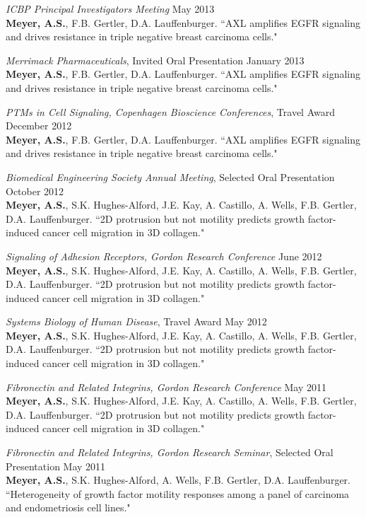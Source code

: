 \documentclass[11pt]{res}
\begin{document}
\begin{resume}
{\sl ICBP Principal Investigators Meeting} \hfill May 2013 \\
{\bf Meyer, A.S.}, F.B. Gertler, D.A. Lauffenburger. ``AXL amplifies EGFR signaling and drives resistance in triple negative breast carcinoma cells."

\clearpage
{\sl Merrimack Pharmaceuticals}, Invited Oral Presentation \hfill January 2013 \\
{\bf Meyer, A.S.}, F.B. Gertler, D.A. Lauffenburger. ``AXL amplifies EGFR signaling and drives resistance in triple negative breast carcinoma cells."

{\sl PTMs in Cell Signaling, Copenhagen Bioscience Conferences}, Travel Award \hfill December 2012 \\
{\bf Meyer, A.S.}, F.B. Gertler, D.A. Lauffenburger. ``AXL amplifies EGFR signaling and drives resistance in triple negative breast carcinoma cells."

{\sl Biomedical Engineering Society Annual Meeting}, Selected Oral Presentation \hfill October 2012 \\
{\bf Meyer, A.S.}, S.K. Hughes-Alford, J.E. Kay, A. Castillo, A. Wells, F.B. Gertler, D.A. Lauffenburger. ``2D protrusion but not motility predicts growth factor-induced cancer cell migration in 3D collagen."

{\sl Signaling of Adhesion Receptors, Gordon Research Conference} \hfill June 2012 \\
{\bf Meyer, A.S.}, S.K. Hughes-Alford, J.E. Kay, A. Castillo, A. Wells, F.B. Gertler, D.A. Lauffenburger. ``2D protrusion but not motility predicts growth factor-induced cancer cell migration in 3D collagen."

{\sl Systems Biology of Human Disease}, Travel Award \hfill May 2012 \\
{\bf Meyer, A.S.}, S.K. Hughes-Alford, J.E. Kay, A. Castillo, A. Wells, F.B. Gertler, D.A. Lauffenburger. ``2D protrusion but not motility predicts growth factor-induced cancer cell migration in 3D collagen."

{\sl Fibronectin and Related Integrins, Gordon Research Conference} \hfill May 2011 \\
{\bf Meyer, A.S.}, S.K. Hughes-Alford, J.E. Kay, A. Castillo, A. Wells, F.B. Gertler, D.A. Lauffenburger. ``2D protrusion but not motility predicts growth factor-induced cancer cell migration in 3D collagen."

{\sl Fibronectin and Related Integrins, Gordon Research Seminar}, Selected Oral Presentation \hfill May 2011 \\
{\bf Meyer, A.S.}, S.K. Hughes-Alford, A. Wells, F.B. Gertler, D.A. Lauffenburger. ``Heterogeneity of growth factor motility responses among a panel of carcinoma and endometriosis cell lines."


\end{resume}
\end{document}
